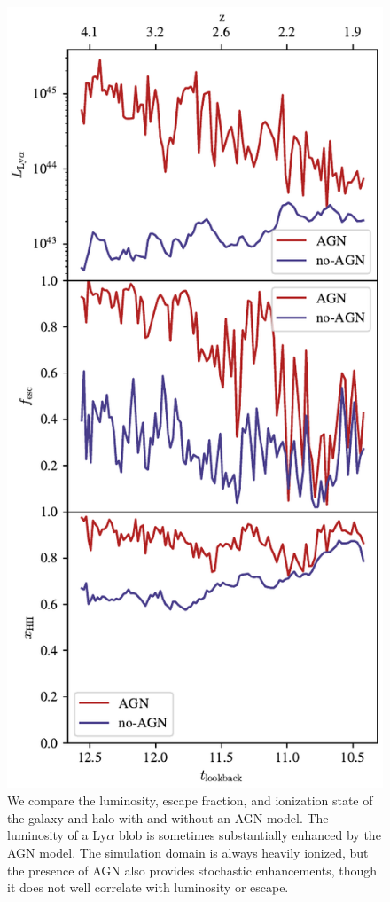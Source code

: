 \begin{figure}
  \centering
    \includegraphics[width=\textwidth,height=\textheight,keepaspectratio]{figures/agn_comparison.pdf}
  \caption{We compare the luminosity, escape fraction, and ionization state of the galaxy and halo with and without an AGN model. The luminosity of a Ly$\alpha$ blob is sometimes substantially enhanced by the AGN model. The simulation domain is always heavily ionized, but the presence of AGN also provides stochastic enhancements, though it does not well correlate with luminosity or escape.}
  \label{fig:agn_comparison}
\end{figure}

